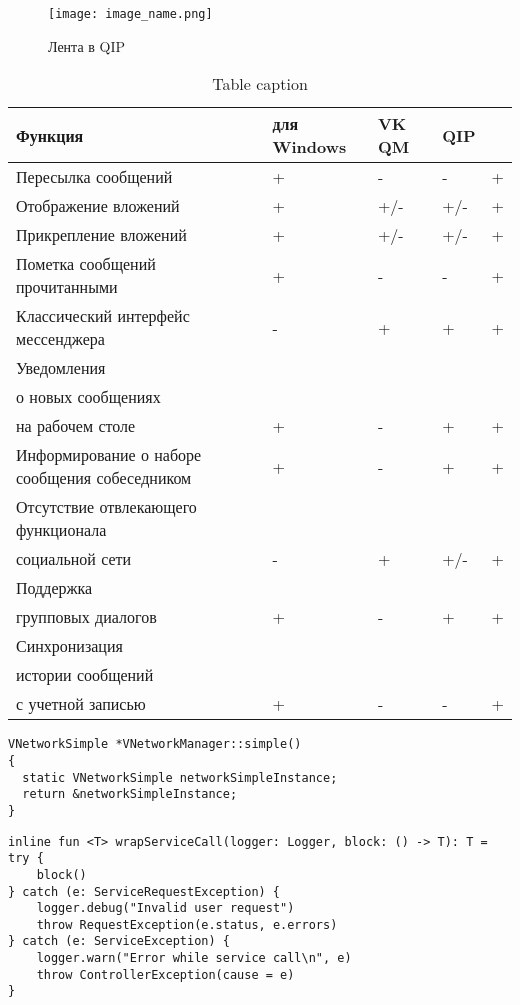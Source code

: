 \begin{figure}[hb!] \centering \texttt{[image: image\_name.png]}
	\caption{Лента в QIP}
	\label{fig:label_name}
\end{figure}

\begin{table}[h] \caption{Table caption}
\label{table:label_name}
\centering
     \begin{tabular}{ | >{\centering}m{} 
					  | >{\centering}m{} 
					  | >{\centering}m{} 
					  | >{\centering}m{}
					  | >{\centering\arraybackslash}m{}|}
	\hline Функция & \vk{} для Windows & VK QM & QIP & \textbf{\vkapp{}}\\
  	\hline Пересылка сообщений & + & - & - & +\\
  	\hline Отображение вложений & + & +/- & +/- & +\\
  	\hline Прикрепление вложений & + & +/- & +/- & +\\
  	\hline Пометка сообщений прочитанными & + & - & - & +\\
  	\hline Классический интерфейс мессенджера & - & + & + & +\\
  	\hline Уведомления \\ о новых сообщениях \\ на рабочем столе  & + & - & + &
  	+\\
  	\hline Информирование о наборе сообщения собеседником & + & - & + & +\\
  	\hline Отсутствие отвлекающего функционала \\ социальной сети & - & + & +/- &
  	+
  	\\
  	\hline Поддержка \\ групповых диалогов & + & - & + & + \\
  	\hline Синхронизация \\ истории сообщений \\ с учетной записью & + & - & - & +
  	\\
  	\hline
  \end{tabular}
\end{table}


\begin{lstlisting}[style = cstyle, 
           caption = {Получение экземпляра класса VNetworkSimple},
           label = lst:vnetworksimple] 
VNetworkSimple *VNetworkManager::simple()
{
  static VNetworkSimple networkSimpleInstance;
  return &networkSimpleInstance;
}
\end{lstlisting}


\begin{lstlisting}[style = ktstyle, 
           caption = {Пример функции на языке \kt{}},
           label = lst:load_page] 
inline fun <T> wrapServiceCall(logger: Logger, block: () -> T): T = try {
    block()
} catch (e: ServiceRequestException) {
    logger.debug("Invalid user request")
    throw RequestException(e.status, e.errors)
} catch (e: ServiceException) {
    logger.warn("Error while service call\n", e)
    throw ControllerException(cause = e)
}
\end{lstlisting}